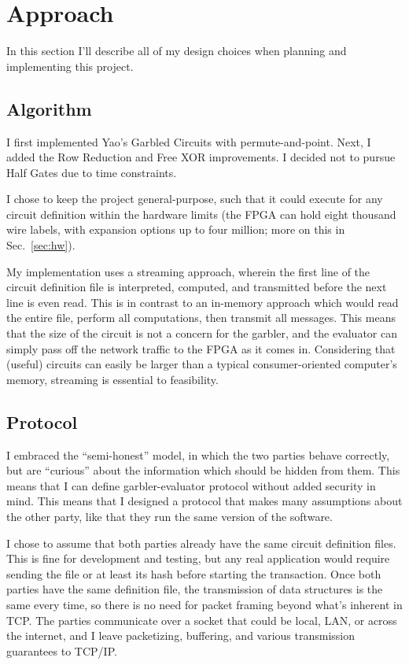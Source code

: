 \section{Approach}
In this section I'll describe all of my design choices when planning and implementing this project.

\subsection{Algorithm}
I first implemented Yao's Garbled Circuits with permute-and-point. Next, I added the Row Reduction and Free XOR improvements. I decided not to pursue Half Gates due to time constraints.

I chose to keep the project general-purpose, such that it could execute for any circuit definition within the hardware limits (the FPGA can hold eight thousand wire labels, with expansion options up to four million; more on this in Sec.~\ref{sec:hw}).

My implementation uses a streaming approach, wherein the first line of the circuit definition file is interpreted, computed, and transmitted before the next line is even read. This is in contrast to an in-memory approach which would read the entire file, perform all computations, then transmit all messages. This means that the size of the circuit is not a concern for the garbler, and the evaluator can simply pass off the network traffic to the FPGA as it comes in. Considering that (useful) circuits can easily be larger than a typical consumer-oriented computer's memory, streaming is essential to feasibility.

\subsection{Protocol}
I embraced the ``semi-honest'' model, in which the two parties behave correctly, but are ``curious'' about the information which should be hidden from them. This means that I can define garbler-evaluator protocol without added security in mind. This means that I designed a protocol that makes many assumptions about the other party, like that they run the same version of the software.

I chose to assume that both parties already have the same circuit definition files. This is fine for development and testing, but any real application would require sending the file or at least its hash before starting the transaction. Once both parties have the same definition file, the transmission of data structures is the same every time, so there is no need for packet framing beyond what's inherent in TCP. The parties communicate over a socket that could be local, LAN, or across the internet, and I leave packetizing, buffering, and various transmission guarantees to TCP/IP.

